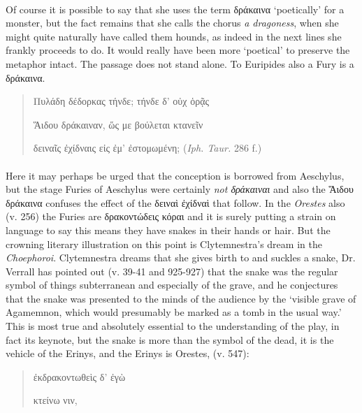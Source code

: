 \documentclass[a4paper, 11pt, oneside, polutonikogreek, english]{article}
\begin{document}
\paragraph{}
Of course it is possible to say that she uses the term δράκαινα `poetically' for a monster, but the fact remains that she calls the chorus \emph{a dragoness}, when she might quite naturally have called them hounds, as indeed in the next lines she frankly proceeds to do. It would really have been more `poetical' to preserve the metaphor intact. The passage does not stand alone. To Euripides also a Fury is a δράκαινα.
\begin{quotation}
\large
Πυλάδη δέδορκας τήνδε; τήνδε δ' οὐχ ὁρᾷς

Ἅιδου δράκαιναν, ὥς με βούλεται κτανεῖν

δειναῖς ἐχίδναις εἰς ἐμ' ἐστομωμένη; (\emph{Iph. Taur.} 286 f.)
\end{quotation}
\paragraph{}
Here it may perhaps be urged that the conception is borrowed from Aeschylus, but the stage Furies of Aeschylus were certainly \emph{not δράκαιναι} and also the Ἅιδου δράκαινα confuses the effect of the δειναὶ ἐχίδναὶ that follow. In the \emph{Orestes} also (v. 256) the Furies are δρακοντώδεις κόραι and it is surely putting a strain on language to say this means they have snakes in their hands or hair. But the crowning literary illustration on this point is Clytemnestra's dream in the \emph{Choephoroi}. Clytemnestra dreams that she gives birth to and suckles a snake, Dr. Verrall has pointed out (v. 39-41 and 925-927) that the snake was the regular symbol of things subterranean and especially of the grave, and he conjectures that the snake was presented to the minds of the audience by the `visible grave of Agamemnon, which would presumably be marked as a tomb in the usual way.' This is most true and absolutely essential to the understanding of the play, in fact its keynote, but the snake is more than the symbol of the dead, it is the vehicle of the Erinys, and the Erinys is Orestes, (v. 547):
\begin{quotation}
\large
\hspace*{20mm}ἐκδρακοντωθεὶς δ' ἐγὼ

κτείνω νιν,
\end{quotation}
\end{document}
